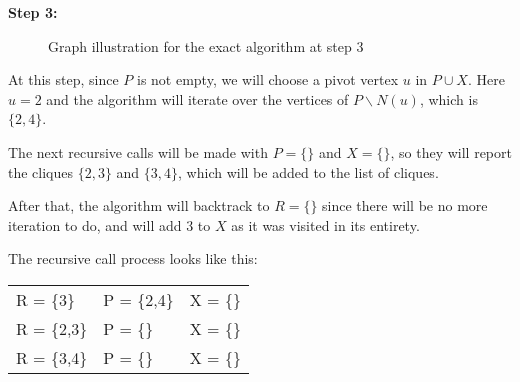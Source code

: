 \begin{minipage}{\linewidth}
    \textbf{Step 3:} \newline
    \begin{minipage}{0.4\textwidth}
        \begin{figure}[H]
            \centering
            \caption{Graph illustration for the exact algorithm at step 3}
            \label{fig:exact-mewc-step3}
        \end{figure}
    \end{minipage}
    \begin{minipage}{0.6\textwidth}
        At this step, since $P$ is not empty, we will choose a pivot vertex $u$
        in $P\cup X$. Here $u = 2$ and the algorithm will iterate over the
        vertices of $P\backslash N(u)$, which is $\{2,4\}$. \newline

        The next recursive calls will be made with $P = \{\}$ and $X = \{\}$, so
        they will report the cliques $\{2,3\}$ and $\{3,4\}$, which will be
        added to the list of cliques. \newline

        After that, the algorithm will backtrack to $R=\{\}$ since there will be
        no more iteration to do, and will add $3$ to $X$ as it was visited in
        its entirety. \newline

        The recursive call process looks like this:
        \begin{center}
            \begin{tabular}{|lll|}
                \hline
                R = \{3\}   & P = \{2,4\} & X = \{\} \\
                R = \{2,3\} & P = \{\}    & X = \{\} \\
                R = \{3,4\} & P = \{\}    & X = \{\} \\
                \hline
            \end{tabular}
        \end{center}
    \end{minipage}
\end{minipage} \newline

